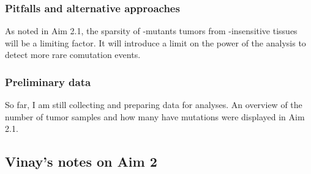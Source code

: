 \subsubsection*{Pitfalls and alternative approaches}

As noted in Aim 2.1, the sparsity of \KRAS{}-mutants tumors from \KRAS{}-insensitive tissues will be a limiting factor.
It will introduce a limit on the power of the analysis to detect more rare comutation events.

\subsubsection*{Preliminary data}

So far, I am still collecting and preparing data for analyses.
An overview of the number of tumor samples and how many have \KRAS{} mutations were displayed in Aim 2.1.

\subsection*{Vinay's notes on Aim 2}

